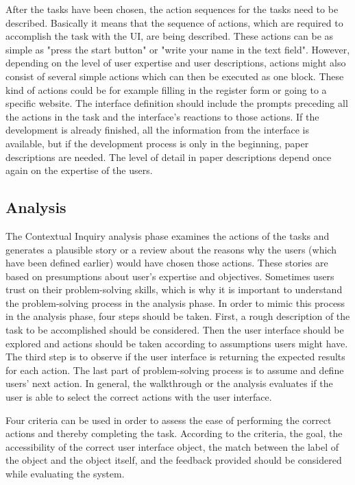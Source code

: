 \documentclass[12pt,a4paper,oneside,pdftex]{report}
\begin{document}
After the tasks have been chosen, the action sequences for the tasks need to be described. Basically it means that the sequence of actions, which are required to accomplish the task with the UI, are being described. These actions can be as simple as "press the start button" or "write your name in the text field". However, depending on the level of user expertise and user descriptions, actions might also consist of several simple actions which can then be executed as one block. These kind of actions could be for example filling in the register form or going to a specific website. The interface definition should include the prompts preceding all the actions in the task and the interface's reactions to those actions. If the development is already finished, all the information from the interface is available, but if the development process is only in the beginning, paper descriptions are needed. The level of detail in paper descriptions depend once again on the expertise of the users. \cite{RefWorks:26}

\subsection{Analysis}

The Contextual Inquiry analysis phase examines the actions of the tasks and generates a plausible story or a review about the reasons why the users (which have been defined earlier) would have chosen those actions. These stories are based on presumptions about user's expertise and objectives. Sometimes users trust on their problem-solving skills, which is why it is important to understand the problem-solving process in the analysis phase. In order to mimic this process in the analysis phase, four steps should be taken. First, a rough description of the task to be accomplished should be considered. Then the user interface should be explored and actions should be taken according to assumptions users might have. The third step is to observe if the user interface is returning the expected results for each action. The last part of problem-solving process is to assume and define users' next action.\cite{RefWorks:26} In general, the walkthrough or the analysis evaluates if the user is able to select the correct actions with the user interface.

Four criteria can be used in order to assess the ease of performing the correct actions and thereby completing the task. According to the criteria, the goal, the accessibility of the correct user interface object, the match between the label of the object and the object itself, and the feedback provided should be considered while evaluating the system. \cite{RefWorks:34}
 
\end{document}
